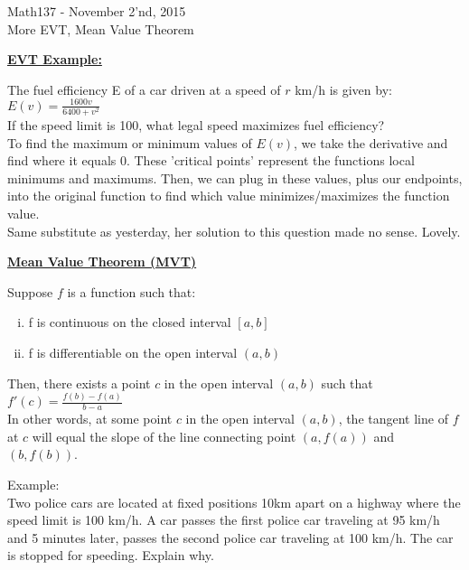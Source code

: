 \documentclass{letter}
\begin{document}
	\begin{center}
		\LARGE Math137 - November 2'nd, 2015\\
		\large More EVT, Mean Value Theorem
	\end{center}
	\vspace{0.25 in}
	\underline{\textbf{EVT Example:}}
	
	The fuel efficiency E of a car driven at a speed of $r$ km/h is given by:\\
	
	$E(v) = \frac{1600v}{6400+v^2}$\\
	
	If the speed limit is 100, what legal speed maximizes fuel efficiency?\\
	
	To find the maximum or minimum values of $E(v)$, we take the derivative and find where it equals 0. These 'critical points' represent the functions local minimums and maximums. Then, we can plug in these values, plus our endpoints, into the original function to find which value minimizes/maximizes the function value.\\
	
	Same substitute as yesterday, her solution to this question made no sense. Lovely.
	
	\underline{\textbf{Mean Value Theorem (MVT)}}
	
	Suppose $f$ is a function such that:
	\begin{enumerate}[i)]
		\item f is continuous on the closed interval $[a, b]$
		\item f is differentiable on the open interval $(a, b)$
	\end{enumerate}
	Then, there exists a point $c$ in the open interval $(a, b)$ such that\\
	
	$f'(c) = \frac{f(b) - f(a)}{b-a}$\\
	
	In other words, at some point $c$ in the open interval $(a, b)$, the tangent line of $f$ at $c$ will equal the slope of the line connecting point $(a, f(a))$ and $(b, f(b))$.
	
	Example:\\
	Two police cars are located at fixed positions 10km apart on a highway where the speed limit is 100 km/h. A car passes the first police car traveling at 95 km/h and 5 minutes later, passes the second police car traveling at 100 km/h. The car is stopped for speeding. Explain why.\\
	
\end{document}

